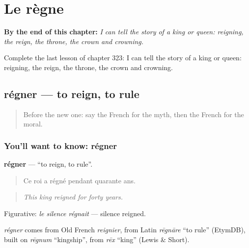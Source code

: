 
\chapter{Le règne}
\label{ch:fr-le-regne}

\begin{chapteropening}
\textbf{By the end of this chapter:} \emph{I can tell the story of a king or queen: reigning, the reign, the throne, the crown and crowning.}

Complete the last lesson of chapter 323: I can tell the story of a king or queen: reigning, the reign, the throne, the crown and crowning.
\end{chapteropening}

\section[régner]{régner — to reign, to rule}

\label{lesson:FR-C323-regner}



\begin{quote}
Before the new one: say the French for the myth, then the French for the moral.
\end{quote}

\subsection*{You'll want to know: régner}
\textbf{régner} — \textquotedblleft{}to reign, to rule\textquotedblright{}.

\begin{quote}
Ce roi a régné pendant quarante ans.
\end{quote}

\begin{quote}
\emph{This king reigned for forty years.}
\end{quote}

Figurative: \emph{le silence régnait} — silence reigned.

\begin{cousinweb}
\emph{régner} comes from Old French \emph{reignier}, from Latin \emph{rēgnāre} \textquotedblleft{}to rule\textquotedblright{} (EtymDB), built on \emph{rēgnum} \textquotedblleft{}kingship\textquotedblright{}, from \emph{rēx} \textquotedblleft{}king\textquotedblright{} (Lewis \& Short).
\end{cousinweb}

